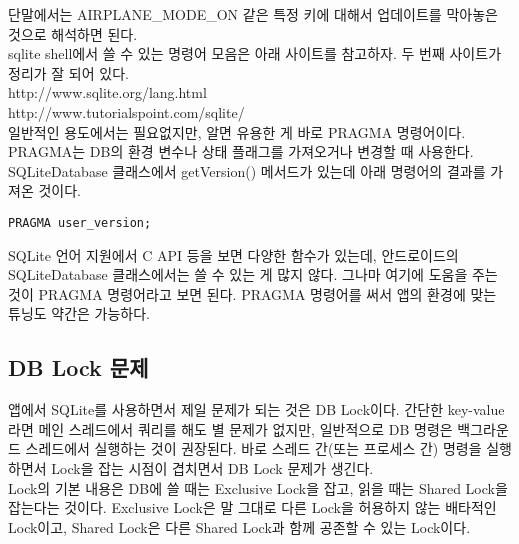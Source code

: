 단말에서는 AIRPLANE\_MODE\_ON 같은 특정 키에 대해서 업데이트를 막아놓은 것으로 해석하면 된다.\\


sqlite shell에서 쓸 수 있는 명령어 모음은 아래 사이트를 참고하자. 두 번째 사이트가 정리가 잘 되어 있다.\\
http://www.sqlite.org/lang.html\\
http://www.tutorialspoint.com/sqlite/\\


일반적인 용도에서는 필요없지만, 알면 유용한 게 바로 PRAGMA 명령어이다. PRAGMA는 DB의 환경 변수나 상태 플래그를 가져오거나 변경할 때 사용한다.
SQLiteDatabase 클래스에서 getVersion() 메서드가 있는데 아래 명령어의 결과를 가져온 것이다. 
\begin{verbatim}
PRAGMA user_version; 
\end{verbatim}

SQLite 언어 지원에서 C API 등을 보면 다양한 함수가 있는데, 안드로이드의 SQLiteDatabase 클래스에서는 쓸 수 있는 게 많지 않다.
그나마 여기에 도움을 주는 것이 PRAGMA 명령어라고 보면 된다. PRAGMA 명령어를 써서 앱의 환경에 맞는 튜닝도 약간은 가능하다.\\


\subsection{DB Lock 문제}
앱에서 SQLite를 사용하면서 제일 문제가 되는 것은 DB Lock이다.
간단한 key-value라면 메인 스레드에서 쿼리를 해도 별 문제가 없지만, 일반적으로 DB 명령은 백그라운드 스레드에서 실행하는 것이 권장된다. 바로 스레드 간(또는 프로세스 간) 명령을 실행하면서 Lock을 잡는 시점이 겹치면서 DB Lock 문제가  생긴다.\\

Lock의 기본 내용은 DB에 쓸 때는 Exclusive Lock을 잡고, 읽을 때는 Shared Lock을 잡는다는 것이다.
Exclusive Lock은 말 그대로 다른 Lock을 허용하지 않는 배타적인 Lock이고, Shared Lock은 다른 Shared Lock과 함께 공존할 수 있는 Lock이다.\\

